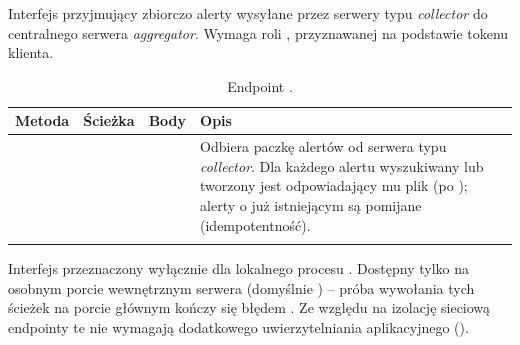 Interfejs przyjmujący zbiorczo alerty wysyłane przez serwery typu \emph{collector} do centralnego
serwera \emph{aggregator}. Wymaga roli , przyznawanej na podstawie tokenu
klienta.

\begingroup\footnotesize
\begin{longtable}{M{1.4cm} M{2.4cm} M{5.6cm} M{5.0cm}}
\toprule
{}
\textbf{Metoda} & \textbf{Ścieżka} & \textbf{Body} & \textbf{Opis} \\
\midrule
\endhead
{} &  &  &
  Odbiera paczkę alertów od serwera typu \emph{collector}. Dla każdego alertu wyszukiwany lub
  tworzony jest odpowiadający mu plik (po ); alerty o już istniejącym  są
  pomijane (idempotentność). \\
\bottomrule
\caption{Endpoint .}
\end{longtable}
\endgroup

\label{sec:internal-api}

Interfejs przeznaczony wyłącznie dla lokalnego procesu . Dostępny tylko na
osobnym porcie wewnętrznym serwera (domyślnie ) -- próba wywołania tych ścieżek na
porcie głównym kończy się błędem . Ze względu na izolację sieciową
endpointy te nie wymagają dodatkowego uwierzytelniania aplikacyjnego ().

